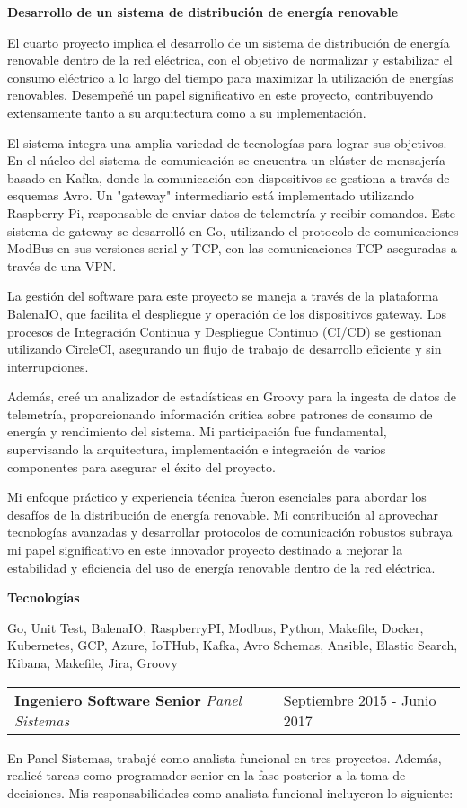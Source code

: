 \documentclass[a4paper,10pt]{article}
\makeatletter
\newcommand{\cvsubsection}[3]{
  \begin{tcolorbox}[colback=gray!20, colframe=gray!20, boxrule=0pt, arc=0mm, outer arc=0mm, width=\dimexpr\textwidth-2mm\relax, boxsep=0pt, left=2mm, right=2mm, top=2mm, bottom=2mm]
    \begin{tabular*}{\dimexpr\textwidth-6mm\relax}{p{0.7\textwidth} @{\extracolsep{\fill}} p{0.3\textwidth}}
      \raggedright
      \textbf{#1} \textit{#2} & \raggedleft \small{#3}
    \end{tabular*}
  \end{tcolorbox}
  \vspace{2mm}
}
\newcommand{\cvsubsubsection}[1]{
\begin{tcolorbox}[colback=gray!10, colframe=gray!10, boxrule=0pt, arc=0mm, outer arc=0mm, width=\textwidth, boxsep=0pt, left=4mm, right=4mm, top=1mm, bottom=1mm]
  \textbf{#1}
\end{tcolorbox}
\vspace{1mm}
}
\newcommand{\cvsubsubsubsection}[1]{
  \begin{tcolorbox}[colback=gray!5, colframe=gray!5, boxrule=0pt, arc=0mm, outer arc=0mm, width=\textwidth, boxsep=0pt, left=6mm, right=6mm, top=1mm, bottom=1mm]
    \textbf{#1}
  \end{tcolorbox}
  \vspace{1mm}
}
\makeatother
\begin{document}
\cvsubsubsection{Desarrollo de un sistema de distribución de energía renovable}
El cuarto proyecto implica el desarrollo de un sistema de distribución de energía renovable dentro de la red eléctrica, con el objetivo de normalizar y estabilizar el consumo eléctrico a lo largo del tiempo para maximizar la utilización de energías renovables. Desempeñé un papel significativo en este proyecto, contribuyendo extensamente tanto a su arquitectura como a su implementación.

El sistema integra una amplia variedad de tecnologías para lograr sus objetivos. En el núcleo del sistema de comunicación se encuentra un clúster de mensajería basado en Kafka, donde la comunicación con dispositivos se gestiona a través de esquemas Avro. Un "gateway" intermediario está implementado utilizando Raspberry Pi, responsable de enviar datos de telemetría y recibir comandos. Este sistema de gateway se desarrolló en Go, utilizando el protocolo de comunicaciones ModBus en sus versiones serial y TCP, con las comunicaciones TCP aseguradas a través de una VPN.

La gestión del software para este proyecto se maneja a través de la plataforma BalenaIO, que facilita el despliegue y operación de los dispositivos gateway. Los procesos de Integración Continua y Despliegue Continuo (CI/CD) se gestionan utilizando CircleCI, asegurando un flujo de trabajo de desarrollo eficiente y sin interrupciones.

Además, creé un analizador de estadísticas en Groovy para la ingesta de datos de telemetría, proporcionando información crítica sobre patrones de consumo de energía y rendimiento del sistema. Mi participación fue fundamental, supervisando la arquitectura, implementación e integración de varios componentes para asegurar el éxito del proyecto.

Mi enfoque práctico y experiencia técnica fueron esenciales para abordar los desafíos de la distribución de energía renovable. Mi contribución al aprovechar tecnologías avanzadas y desarrollar protocolos de comunicación robustos subraya mi papel significativo en este innovador proyecto destinado a mejorar la estabilidad y eficiencia del uso de energía renovable dentro de la red eléctrica.

\cvsubsubsubsection{Tecnologías}
Go, Unit Test, BalenaIO, RaspberryPI, Modbus, Python, Makefile, Docker, Kubernetes, GCP, Azure, IoTHub, Kafka, Avro Schemas, Ansible, Elastic Search, Kibana, Makefile, Jira, Groovy

\cvsubsection{Ingeniero Software Senior}{Panel Sistemas}{Septiembre 2015 - Junio 2017}
En Panel Sistemas, trabajé como analista funcional en tres proyectos. Además, realicé tareas como programador senior en la fase posterior a la toma de decisiones. Mis responsabilidades como analista funcional incluyeron lo siguiente:
\end{document}
